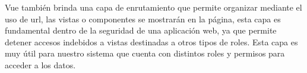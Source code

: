 



Vue también brinda una capa de enrutamiento que permite organizar mediante el uso de url, las vistas o componentes se mostrarán en la página, esta capa es fundamental dentro de la seguridad de una aplicación web, ya que permite detener accesos indebidos a vistas destinadas a otros tipos de roles.
Esta capa es muy útil para nuestro sistema que cuenta con distintos roles y permisos para acceder a los datos.


